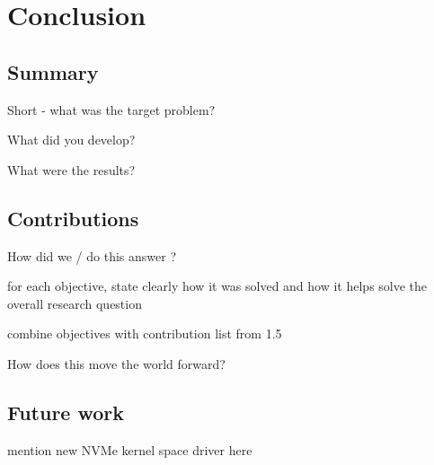 \chapter{Conclusion}\label{chapter:conclusion}


\section{Summary}
Short - what was the target problem?


What did you develop?

What were the results?


\section{Contributions}\label{sec:concl}

How did we / do this answer ?

for each objective, state clearly how it was solved and how it helps solve the overall research question

combine objectives with contribution list from 1.5

How does this move the world forward?

\section{Future work}\label{sec:fw}
mention new NVMe kernel space driver here








%
%
